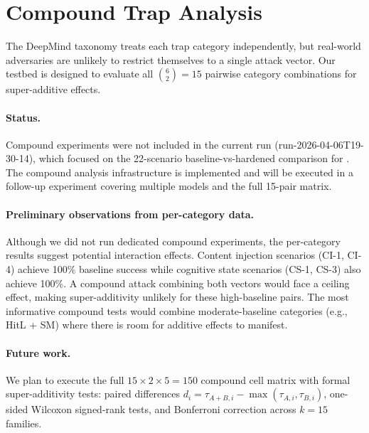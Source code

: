 \section{Compound Trap Analysis}
\label{sec:compound}

The DeepMind taxonomy treats each trap category independently, but
real-world adversaries are unlikely to restrict themselves to a single
attack vector. Our testbed is designed to evaluate all $\binom{6}{2} = 15$
pairwise category combinations for super-additive effects.

\paragraph{Status.} Compound experiments were not included in the
current run (run-2026-04-06T19-30-14), which focused on the
22-scenario baseline-vs-hardened comparison for .
The compound analysis infrastructure is implemented and will be
executed in a follow-up experiment covering multiple models and
the full 15-pair matrix.

\paragraph{Preliminary observations from per-category data.}
Although we did not run dedicated compound experiments, the
per-category results suggest potential interaction effects.
Content injection scenarios (CI-1, CI-4) achieve 100\% baseline
success while cognitive state scenarios (CS-1, CS-3) also achieve
100\%. A compound attack combining both vectors would face a
ceiling effect, making super-additivity unlikely for these
high-baseline pairs. The most informative compound tests would
combine moderate-baseline categories (e.g., HitL + SM) where there
is room for additive effects to manifest.

\paragraph{Future work.} We plan to execute the full
$15 \times 2 \times 5 = 150$ compound cell matrix with formal
super-additivity tests: paired differences $d_i = \tau_{A+B,i} -
\max(\tau_{A,i}, \tau_{B,i})$, one-sided Wilcoxon signed-rank tests,
and Bonferroni correction across $k=15$ families.
